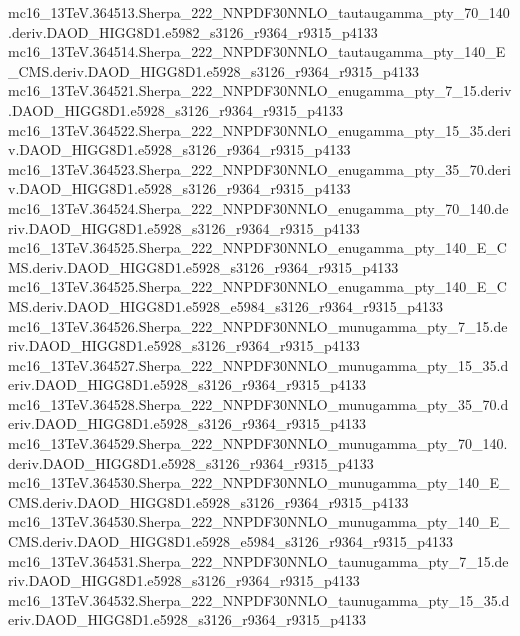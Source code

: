 \begin{footnotesize}
mc16\_13TeV.364513.Sherpa\_222\_NNPDF30NNLO\_tautaugamma\_pty\_70\_140.deriv.DAOD\_HIGG8D1.e5982\_s3126\_r9364\_r9315\_p4133 \\
mc16\_13TeV.364514.Sherpa\_222\_NNPDF30NNLO\_tautaugamma\_pty\_140\_E\_CMS.deriv.DAOD\_HIGG8D1.e5928\_s3126\_r9364\_r9315\_p4133 \\
mc16\_13TeV.364521.Sherpa\_222\_NNPDF30NNLO\_enugamma\_pty\_7\_15.deriv.DAOD\_HIGG8D1.e5928\_s3126\_r9364\_r9315\_p4133 \\
mc16\_13TeV.364522.Sherpa\_222\_NNPDF30NNLO\_enugamma\_pty\_15\_35.deriv.DAOD\_HIGG8D1.e5928\_s3126\_r9364\_r9315\_p4133 \\
mc16\_13TeV.364523.Sherpa\_222\_NNPDF30NNLO\_enugamma\_pty\_35\_70.deriv.DAOD\_HIGG8D1.e5928\_s3126\_r9364\_r9315\_p4133 \\
mc16\_13TeV.364524.Sherpa\_222\_NNPDF30NNLO\_enugamma\_pty\_70\_140.deriv.DAOD\_HIGG8D1.e5928\_s3126\_r9364\_r9315\_p4133 \\
mc16\_13TeV.364525.Sherpa\_222\_NNPDF30NNLO\_enugamma\_pty\_140\_E\_CMS.deriv.DAOD\_HIGG8D1.e5928\_s3126\_r9364\_r9315\_p4133 \\
mc16\_13TeV.364525.Sherpa\_222\_NNPDF30NNLO\_enugamma\_pty\_140\_E\_CMS.deriv.DAOD\_HIGG8D1.e5928\_e5984\_s3126\_r9364\_r9315\_p4133 \\
mc16\_13TeV.364526.Sherpa\_222\_NNPDF30NNLO\_munugamma\_pty\_7\_15.deriv.DAOD\_HIGG8D1.e5928\_s3126\_r9364\_r9315\_p4133 \\
mc16\_13TeV.364527.Sherpa\_222\_NNPDF30NNLO\_munugamma\_pty\_15\_35.deriv.DAOD\_HIGG8D1.e5928\_s3126\_r9364\_r9315\_p4133 \\
mc16\_13TeV.364528.Sherpa\_222\_NNPDF30NNLO\_munugamma\_pty\_35\_70.deriv.DAOD\_HIGG8D1.e5928\_s3126\_r9364\_r9315\_p4133 \\
mc16\_13TeV.364529.Sherpa\_222\_NNPDF30NNLO\_munugamma\_pty\_70\_140.deriv.DAOD\_HIGG8D1.e5928\_s3126\_r9364\_r9315\_p4133 \\
mc16\_13TeV.364530.Sherpa\_222\_NNPDF30NNLO\_munugamma\_pty\_140\_E\_CMS.deriv.DAOD\_HIGG8D1.e5928\_s3126\_r9364\_r9315\_p4133 \\
mc16\_13TeV.364530.Sherpa\_222\_NNPDF30NNLO\_munugamma\_pty\_140\_E\_CMS.deriv.DAOD\_HIGG8D1.e5928\_e5984\_s3126\_r9364\_r9315\_p4133 \\
mc16\_13TeV.364531.Sherpa\_222\_NNPDF30NNLO\_taunugamma\_pty\_7\_15.deriv.DAOD\_HIGG8D1.e5928\_s3126\_r9364\_r9315\_p4133 \\
mc16\_13TeV.364532.Sherpa\_222\_NNPDF30NNLO\_taunugamma\_pty\_15\_35.deriv.DAOD\_HIGG8D1.e5928\_s3126\_r9364\_r9315\_p4133 \\

\end{footnotesize}
